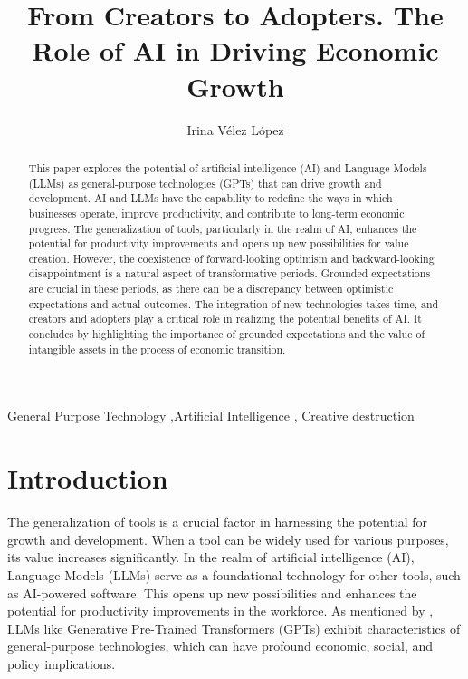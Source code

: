 \documentclass[preprint, 1p,
authoryear]{elsarticle} %
\begin{document}
\begin{frontmatter}

  \title{From Creators to Adopters. The Role of AI in Driving Economic
Growth}
    \author[Hanken School of Economics]{Irina Vélez López%
  }
  
  \begin{abstract}
  This paper explores the potential of artificial intelligence (AI) and
  Language Models (LLMs) as general-purpose technologies (GPTs) that can
  drive growth and development. AI and LLMs have the capability to
  redefine the ways in which businesses operate, improve productivity,
  and contribute to long-term economic progress. The generalization of
  tools, particularly in the realm of AI, enhances the potential for
  productivity improvements and opens up new possibilities for value
  creation. However, the coexistence of forward-looking optimism and
  backward-looking disappointment is a natural aspect of transformative
  periods. Grounded expectations are crucial in these periods, as there
  can be a discrepancy between optimistic expectations and actual
  outcomes. The integration of new technologies takes time, and creators
  and adopters play a critical role in realizing the potential benefits
  of AI. It concludes by highlighting the importance of grounded
  expectations and the value of intangible assets in the process of
  economic transition.
  \end{abstract}
    \begin{keyword}
    General Purpose Technology \sep Artificial Intelligence \sep 
    Creative destruction
  \end{keyword}
  
 \end{frontmatter}

\hypertarget{introduction}{%
\section{Introduction}\label{introduction}}

The generalization of tools is a crucial factor in harnessing the
potential for growth and development. When a tool can be widely used for
various purposes, its value increases significantly. In the realm of
artificial intelligence (AI), Language Models (LLMs) serve as a
foundational technology for other tools, such as AI-powered software.
This opens up new possibilities and enhances the potential for
productivity improvements in the workforce. As mentioned by
\citep{gptaregpts}, LLMs like Generative Pre-Trained Transformers (GPTs)
exhibit characteristics of general-purpose technologies, which can have
profound economic, social, and policy implications.
\end{document}
